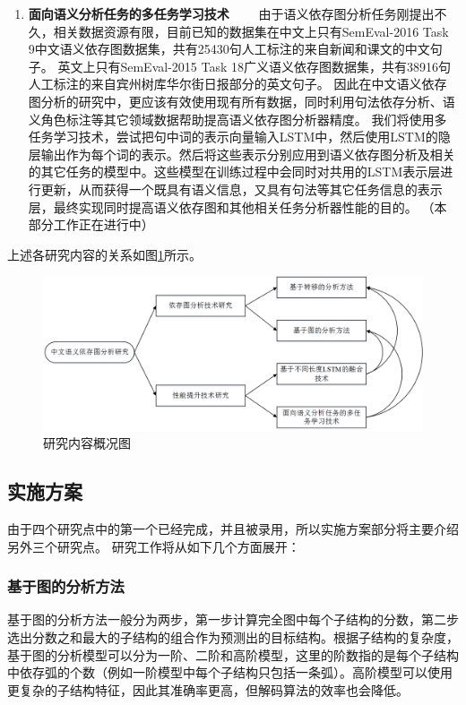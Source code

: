 \begin{enumerate}
	\item \textbf{面向语义分析任务的多任务学习技术}
	\ \ \ \ 由于语义依存图分析任务刚提出不久，相关数据资源有限，目前已知的数据集在中文上只有SemEval-2016 Task 9中文语义依存图数据集，共有25430句人工标注的来自新闻和课文的中文句子。
	英文上只有SemEval-2015 Task 18广义语义依存图数据集，共有38916句人工标注的来自宾州树库华尔街日报部分的英文句子。
	因此在中文语义依存图分析的研究中，更应该有效使用现有所有数据，同时利用句法依存分析、语义角色标注等其它领域数据帮助提高语义依存图分析器精度。
	我们将使用多任务学习技术，尝试把句中词的表示向量输入LSTM中，然后使用LSTM的隐层输出作为每个词的表示。然后将这些表示分别应用到语义依存图分析及相关的其它任务的模型中。这些模型在训练过程中会同时对共用的LSTM表示层进行更新，从而获得一个既具有语义信息，又具有句法等其它任务信息的表示层，最终实现同时提高语义依存图和其他相关任务分析器性能的目的。
	（本部分工作正在进行中）
	
\end{enumerate}

上述各研究内容的关系如图\ref{fig:relation}所示。
\begin{figure}[htbp]
	\centering
	\includegraphics[width = 140mm]{picture/relation.jpg}
	\caption{研究内容概况图}
	\label{fig:relation}
\end{figure}



\subsection{实施方案}

由于四个研究点中的第一个已经完成，并且被录用，所以实施方案部分将主要介绍另外三个研究点。
研究工作将从如下几个方面展开：

\subsubsection{基于图的分析方法}

基于图的分析方法一般分为两步，第一步计算完全图中每个子结构的分数，第二步选出分数之和最大的子结构的组合作为预测出的目标结构。根据子结构的复杂度，基于图的分析模型可以分为一阶、二阶和高阶模型，这里的阶数指的是每个子结构中依存弧的个数（例如一阶模型中每个子结构只包括一条弧）。高阶模型可以使用更复杂的子结构特征，因此其准确率更高，但解码算法的效率也会降低。

